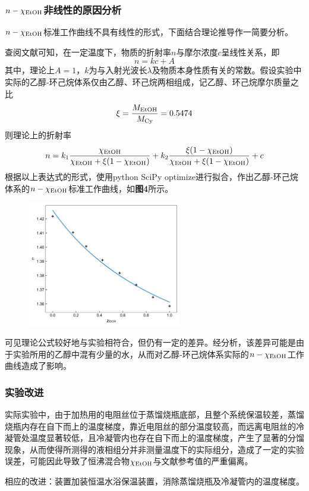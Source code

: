 \documentclass[12pt]{article}
\begin{document}
 	\subsubsection{$n-\chi_{\ce{EtOH}}$非线性的原因分析}
		$n-\chi_{\ce{EtOH}}$标准工作曲线不具有线性的形式，下面结合理论推导作一简要分析。\par 查阅文献可知\citealp{wenxian2}，在一定温度下，物质的折射率$n$与摩尔浓度$c$呈线性关系，即
		$$
		n=kc+A
		$$
		其中，理论上$A=1$，$k$为与入射光波长$\lambda$及物质本身性质有关的常数。假设实验中实际的乙醇-环己烷体系仅由乙醇、环己烷两相组成，记乙醇、环己烷摩尔质量之比
		$$
		\xi=\frac{M_{\rm EtOH}}{M_{\rm Cy}}=0.5474
		$$
		则理论上的折射率
		$$
		n=k_{1}\frac{\chi_{\ce{EtOH}}}{\chi_{\ce{EtOH}}+\xi (1-\chi_{\ce{EtOH}})}+k_{2}\frac{\xi (1-\chi_{\ce{EtOH}})}{\chi_{\ce{EtOH}}+\xi (1-\chi_{\ce{EtOH}})}+c
		$$ 		
		根据以上表达式的形式，使用python SciPy optimize进行拟合，作出乙醇-环己烷体系的$n-\chi_{\ce{EtOH}}$标准工作曲线，如\textbf{图4}所示。
		\begin{figure}[h]
			\centering
			\includegraphics[width=0.6\textwidth]{4.jpg}
		\end{figure}
		\par
		可见理论公式较好地与实验相符合，但仍有一定的差异。经分析，该差异可能是由于实验所用的乙醇中混有少量的水，从而对乙醇-环己烷体系实际的$n-\chi_{\ce{EtOH}}$工作曲线造成了影响。
 			\subsubsection{实验改进}
 			实际实验中，由于加热用的电阻丝位于蒸馏烧瓶底部，且整个系统保温较差，蒸馏烧瓶内存在自下而上的温度梯度，靠近电阻丝的部分温度较高，而远离电阻丝的冷凝管处温度显著较低，且冷凝管内也存在自下而上的温度梯度，产生了显著的分馏现象，从而使得所测得的液相组分并非测量温度下的实际组分，造成了一定的实验误差，可能因此导致了恒沸混合物$\chi_{\ce{EtOH}}$与文献参考值的严重偏离。\par 
 			相应的改进：装置加装恒温水浴保温装置，消除蒸馏烧瓶及冷凝管内的温度梯度。
 		
\end{document}

